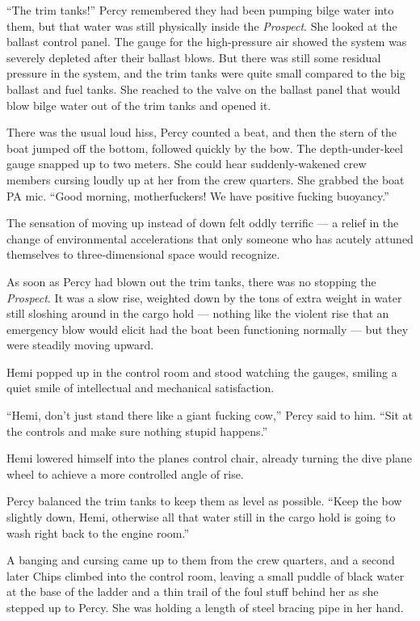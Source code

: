 \documentclass[
]{scrbook}
\begin{document}
``The trim tanks!'' Percy remembered they had been pumping bilge water
into them, but that water was still physically inside the
\emph{Prospect}. She looked at the ballast control panel. The gauge for
the high-pressure air showed the system was severely depleted after
their ballast blows. But there was still some residual pressure in the
system, and the trim tanks were quite small compared to the big ballast
and fuel tanks. She reached to the valve on the ballast panel that would
blow bilge water out of the trim tanks and opened it.

There was the usual loud hiss, Percy counted a beat, and then the stern
of the boat jumped off the bottom, followed quickly by the bow. The
depth-under-keel gauge snapped up to two meters. She could hear
suddenly-wakened crew members cursing loudly up at her from the crew
quarters. She grabbed the boat PA mic. ``Good morning, motherfuckers! We
have positive fucking buoyancy.''

\bigskip

The sensation of moving up instead of down felt oddly terrific --- a
relief in the change of environmental accelerations that only someone
who has acutely attuned themselves to three-dimensional space would
recognize.

As soon as Percy had blown out the trim tanks, there was no stopping the
\emph{Prospect}. It was a slow rise, weighted down by the tons of extra
weight in water still sloshing around in the cargo hold --- nothing like
the violent rise that an emergency blow would elicit had the boat been
functioning normally --- but they were steadily moving upward.

Hemi popped up in the control room and stood watching the gauges,
smiling a quiet smile of intellectual and mechanical satisfaction.

``Hemi, don't just stand there like a giant fucking cow,'' Percy said to
him. ``Sit at the controls and make sure nothing stupid happens.''

Hemi lowered himself into the planes control chair, already turning the
dive plane wheel to achieve a more controlled angle of rise.

Percy balanced the trim tanks to keep them as level as possible. ``Keep
the bow slightly down, Hemi, otherwise all that water still in the cargo
hold is going to wash right back to the engine room.''

A banging and cursing came up to them from the crew quarters, and a
second later Chips climbed into the control room, leaving a small puddle
of black water at the base of the ladder and a thin trail of the foul
stuff behind her as she stepped up to Percy. She was holding a length of
steel bracing pipe in her hand.
\end{document}
